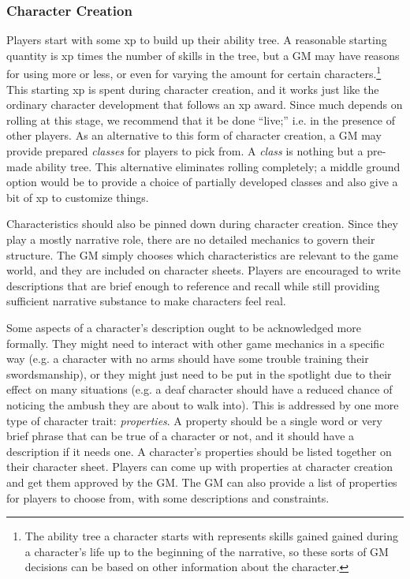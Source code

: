 \documentclass[12pt]{article}
\begin{document}
\subsubsection{Character Creation}\label{sec:creation}
Players start with some xp to build up their ability tree. 
A reasonable starting quantity is xp times the number of skills in the tree,
but a GM may have reasons for using more or less, or even for varying the amount for certain characters.\footnote{
The ability tree a character starts with represents skills gained
gained during a character's life up to the beginning of the narrative,
so these sorts of GM decisions can be based on other information about the character.}
This starting xp is spent during character creation, and it works just like the ordinary character development that follows an xp award.
Since much depends on rolling at this stage, we recommend that it be done ``live;'' i.e. in the presence of other players.
As an alternative to this form of character creation, a GM may provide prepared \emph{classes} for players to pick from.
A \emph{class} is nothing but a pre-made ability tree.
This alternative eliminates rolling completely; a middle ground option would be to provide a choice
of partially developed classes and also give a bit of xp to customize things.

Characteristics should also be pinned down during character creation.
Since they play a mostly narrative role, there are no detailed mechanics to govern their structure.
The GM simply chooses which characteristics are relevant to the game world, and they are included on character sheets.
Players are encouraged to write descriptions that are brief enough to reference and recall while still
providing sufficient narrative substance to make characters feel real.

Some aspects of a character's description ought to be acknowledged more formally.
They might need to interact with other game mechanics
in a specific way (e.g. a character with no arms should have some trouble training their swordsmanship),
or they might just need to be put in the spotlight due to their effect on many situations
(e.g. a deaf character should have a reduced chance of noticing the ambush they are about to walk into).
This is addressed by one more type of character trait: \emph{properties}.
A property should be a single word or very brief phrase that can be true of a character or not,
and it should have a description if it needs one.
A character's properties should be listed together on their character sheet.
Players can come up with properties at character creation and get them approved by the GM.
The GM can also provide a list of properties for players to choose from, with some descriptions and constraints.
\end{document}
